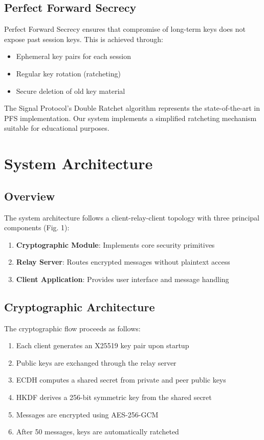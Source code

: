 \documentclass[conference]{IEEEtran}
\begin{document}
\subsection{Perfect Forward Secrecy}

Perfect Forward Secrecy ensures that compromise of long-term keys does not expose past session keys. This is achieved through:

\begin{itemize}
    \item Ephemeral key pairs for each session
    \item Regular key rotation (ratcheting)
    \item Secure deletion of old key material
\end{itemize}

The Signal Protocol's Double Ratchet algorithm \cite{marlinspike2016} represents the state-of-the-art in PFS implementation. Our system implements a simplified ratcheting mechanism suitable for educational purposes.

\section{System Architecture}

\subsection{Overview}

The system architecture follows a client-relay-client topology with three principal components (Fig. 1):

\begin{enumerate}
    \item \textbf{Cryptographic Module}: Implements core security primitives
    \item \textbf{Relay Server}: Routes encrypted messages without plaintext access
    \item \textbf{Client Application}: Provides user interface and message handling
\end{enumerate}

\subsection{Cryptographic Architecture}

The cryptographic flow proceeds as follows:

\begin{enumerate}
    \item Each client generates an X25519 key pair upon startup
    \item Public keys are exchanged through the relay server
    \item ECDH computes a shared secret from private and peer public keys
    \item HKDF derives a 256-bit symmetric key from the shared secret
    \item Messages are encrypted using AES-256-GCM
    \item After 50 messages, keys are automatically ratcheted
\end{enumerate}
\end{document}
